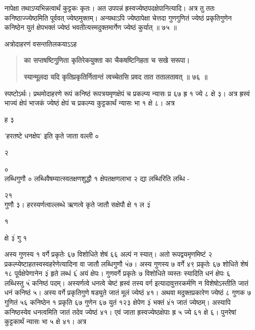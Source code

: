 \documentclass[11pt, openany]{book}
\begin{document}
\begin{sloppypar}
\hangindent=0.2in नापेक्षा तथाऽप्यभिन्नत्वार्थं कुट्टकः कृतः। अत उपपन्नं ह्रस्वज्येष्ठपदक्षेपानित्यादि। अत्र तु ततः कनिष्ठाज्ज्येष्ठमिति पूर्ववत् ज्येष्ठमुक्तम्। अन्यथाऽपि ज्येष्ठापेक्षा चेत्तदा गुणगुणितं ज्येष्ठं प्रकृतिगुणेन कनिष्ठेन युतं क्षेपभक्तं ज्येष्ठं भवतीत्यस्मदुक्तमार्गेण ज्येष्ठं कुर्यात् ॥ ७५ ॥

\hangindent=0.2in \hspace{0.2in}अत्रोदाहरणं वसन्ततिलकयाऽऽह\textendash

\begin{quote}
\hspace{0.2in}\textbf{का सप्तषष्टिगुणिता कृतिरेकयुक्ता का चैकषष्टिनिहता च सखे सरूपा।}

\hspace{0.2in}\textbf{स्यान्मूलदा यदि कृतिप्रकृतिर्नितान्तं त्वच्चेतसि प्रवद तात ततालतावत् ॥ ७६ ॥}
\end{quote}

\hangindent=0.2in \hspace{0.2in}स्पष्टोऽर्थः। प्रथमोदाहरणे रूपं कनिष्ठं रूपत्रयमृणक्षेपं च प्रकल्प्य न्यासः प्र ६७ ह्र १ ज्ये ८ क्षे ३। अत्र ह्रस्वं भाज्यं क्षेपं भाजकं ज्येष्ठं क्षेपं च प्रकल्प्य कुट्टकार्थं न्यासः भा १ क्षे ८। अत्र

\hspace{4.7in}ह ३

'हरतष्टे धनक्षेप' इति कृते जाता वल्ली ०

\hspace{2.35in}२

\hspace{2.35in}०\\

\hangindent=0.2in लब्धिगुणौ ० लब्धिवैषम्यात्स्वतक्षणशुद्धौ १ क्षेपतक्षणलाभा २ द्या लब्धिरिति लब्धि -

\hspace{0.7in}२\hspace{1.75in}१\\

\hangindent=0.2in गुणौ ३। हरस्यर्णत्वाल्लब्धे ऋणत्वे कृते जातौ सक्षेपौ क्षे १ ल ३ं

\hspace{0.35in}१

\hspace{3.25in}क्षे ३ं गु १

\hangindent=0.2in अस्य गुणस्य १ वर्गे प्रकृतेः ६७ विशोधिते शेषं ६६ अल्पं न स्यात्। अतो रूपद्वयमृणमिष्टं २ प्रकल्प्येष्टाहतस्वस्वहरेणेत्यादिना वा जातौ लब्धिगुणौ ५ं७। अस्य गुणस्य ७ वर्गे ४९ प्रकृतेः ६७ शोधिते शेषं १८ पूर्वक्षेपेणानेन ३ं हृते लब्धं ६ं अयं क्षेपः। गुणवर्गे प्रकृतेः ७ विशोधिते व्यस्तः स्यादिति धनं क्षेपः ६ लब्धिस्तु ५ं कनिष्ठं पदम्। अस्यर्णत्वे धनत्वे चेष्टं ह्रस्वं तस्य वर्ग इत्यादावुत्तरकर्मणि न विशेषोऽस्तीति जातं धनं कनिष्ठं ५। अस्य वर्गे प्रकृतिगुणे षड्युते जातं मूलं ज्येष्ठं ४१। अथवा मदुक्तप्रकारेण ज्येष्ठं ८ गुणक ७ गुणितं ५६ कनिष्ठेन १ प्रकृति ६७ गुणेन ६७ युतं १२३ क्षेपेण ३ं भक्तं ४ं१ जातं ज्येष्ठम्। अस्यापि कनिष्ठस्येव धनत्वमिति जातं तदेव ज्येष्ठं ४१। एवं जाता ह्रस्वज्येष्ठक्षेपाः ह्र ५ ज्ये ६१ क्षे ६। पुनरेषां कुट्टकार्थं न्यासः भा ५ क्षे ४१। अत्र 


\end{sloppypar}
\end{document}
